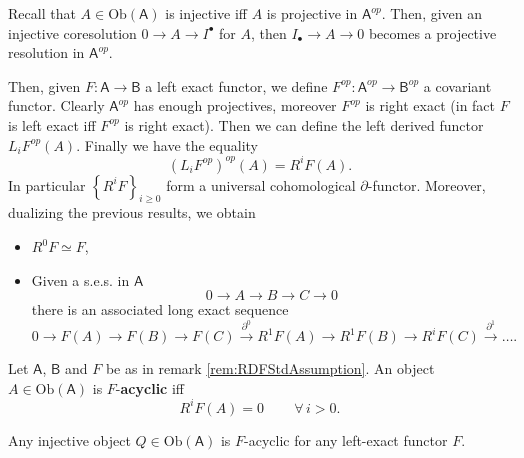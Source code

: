\begin{rem}[Important!]
	Recall that $A \in \mathrm{Ob} \left(\mathsf{A}\right)$ is injective
	iff $A$ is projective in $\mathsf{A}^{op}$.
	Then, given an injective coresolution $0 \to A \to I^\bullet$ for $A$,
	then $I_{\bullet} \to A \to 0$ becomes a projective resolution in $\mathsf{A}^{op}$.

	Then, given $F: \mathsf{A} \to \mathsf{B}$ a left exact functor, 
	we define $F^{op}: \mathsf{A}^{op} \to \mathsf{B}^{op}$ a covariant functor.
	Clearly $\mathsf{A}^{op}$ has enough projectives, moreover $F^{op}$ is right exact
	(in fact $F$ is left exact iff $F^{op}$ is right exact).
	Then we can define the left derived functor $L_iF^{op}(A)$.
	Finally we have the equality
	\begin{equation}
		\left( L_i F^{op} \right)^{op} (A) = R^i F(A)
	.\end{equation} 
	In particular $\left\{ R^iF \right\}_{i \geq 0}$ form a universal cohomological $\partial$-functor.
	Moreover, dualizing the previous results, we obtain
	\begin{itemize}
		\item $R^0F \simeq F$,
		\item Given a s.e.s. in $\mathsf{A}$
			\begin{equation}
			0 \to A \to B \to C \to 0
			\end{equation} 
			there is an associated long exact sequence
			\begin{equation}
				0 \to F(A) \to F(B) \to F(C) \xrightarrow{\partial^0} 
				R^1F(A) \to R^1F(B) \to R^iF(C) \xrightarrow{\partial^1} 
				\ldots
			.\end{equation} 
	\end{itemize}
\end{rem}

\begin{defn}
	Let $\mathsf{A}$, $\mathsf{B}$ and $F$ be as in remark \ref{rem:RDFStdAssumption}.
	An object $A \in \mathrm{Ob} \left(\mathsf{A}\right)$ is
	$F$-\textbf{acyclic} iff
	\begin{equation}
		R^iF(A) = 0 \qquad \,\forall\, i > 0
	.\end{equation} 
\end{defn}

\begin{rem}[]
	Any injective object $Q \in \mathrm{Ob} \left(\mathsf{A}\right)$ is 
	$F$-acyclic for any left-exact functor $F$.
\end{rem}

